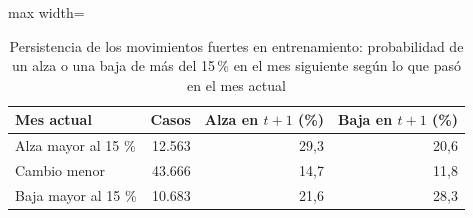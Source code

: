 \begin{table}[htbp]\centering\small
\caption{Persistencia de los movimientos fuertes en entrenamiento: probabilidad de un alza o una baja de más del 15\,\% en el mes siguiente según lo que pasó en el mes actual}\label{tab:persistencia}
\begin{adjustbox}{max width=\textwidth}\begin{tabular}{lrrr}\toprule
Mes actual & Casos & Alza en $t+1$ (\%) & Baja en $t+1$ (\%)\\ \midrule
Alza mayor al 15 \% & 12.563 & 29{,}3 & 20{,}6 \\
Cambio menor & 43.666 & 14{,}7 & 11{,}8 \\
Baja mayor al 15 \% & 10.683 & 21{,}6 & 28{,}3 \\
\bottomrule\end{tabular}\end{adjustbox}\end{table}
